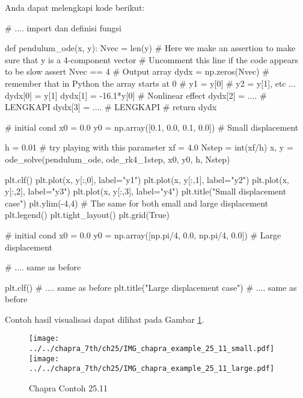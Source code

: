 Anda dapat melengkapi kode berikut:
\begin{pythoncode}
# .... import dan definisi fungsi

def pendulum_ode(x, y):
    Nvec = len(y)
    # Here we make an assertion to make sure that y is a 4-component vector
    # Uncomment this line if the code appears to be slow
    assert Nvec == 4
    # Output array
    dydx = np.zeros(Nvec)
    # remember that in Python the array starts at 0
    # y1 = y[0]
    # y2 = y[1], etc ...
    dydx[0] = y[1]
    dydx[1] = -16.1*y[0]
    # Nonlinear effect
    dydx[2] = .... # LENGKAPI
    dydx[3] = .... # LENGKAPI
    # 
    return dydx


# initial cond
x0 = 0.0
y0 = np.array([0.1, 0.0, 0.1, 0.0]) # Small displacement

h = 0.01 # try playing with this parameter
xf = 4.0
Nstep = int(xf/h)
x, y = ode_solve(pendulum_ode, ode_rk4_1step, x0, y0, h, Nstep)

plt.clf()
plt.plot(x, y[:,0], label="y1")
plt.plot(x, y[:,1], label="y2")
plt.plot(x, y[:,2], label="y3")
plt.plot(x, y[:,3], label="y4")
plt.title("Small displacement case")
plt.ylim(-4,4) # The same for both small and large displacement
plt.legend()
plt.tight_layout()
plt.grid(True)


# initial cond
x0 = 0.0
y0 = np.array([np.pi/4, 0.0, np.pi/4, 0.0]) # Large displacement

# .... same as before

plt.clf()
# .... same as before
plt.title("Large displacement case")
# .... same as before
\end{pythoncode}

Contoh hasil visualisasi dapat dilihat pada Gambar \ref{fig:chapra_example_25_11}.

\begin{figure}[h]
{\centering
\texttt{[image: ../../chapra\_7th/ch25/IMG\_chapra\_example\_25\_11\_small.pdf]}
\texttt{[image: ../../chapra\_7th/ch25/IMG\_chapra\_example\_25\_11\_large.pdf]}
\par}
\caption{Chapra Contoh 25.11}
\label{fig:chapra_example_25_11}
\end{figure}